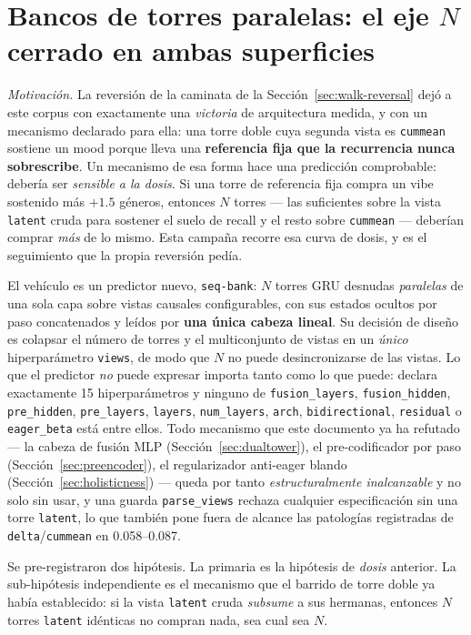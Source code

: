 \documentclass[11pt]{article}
\begin{document}
\section{Bancos de torres paralelas: el eje $N$ cerrado en ambas superficies}
\label{sec:towerbank}
\emph{Motivación.} La reversión de la caminata de la
Sección~\ref{sec:walk-reversal} dejó a este corpus con exactamente una
\emph{victoria} de arquitectura medida, y con un mecanismo declarado para ella:
una torre doble cuya segunda vista es \texttt{cummean} sostiene un mood porque
lleva una \textbf{referencia fija que la recurrencia nunca sobrescribe}. Un
mecanismo de esa forma hace una predicción comprobable: debería ser
\emph{sensible a la dosis}. Si una torre de referencia fija compra un vibe
sostenido más $+\num{1.5}$ géneros, entonces $N$ torres --- las suficientes sobre
la vista \texttt{latent} cruda para sostener el suelo de recall y el resto sobre
\texttt{cummean} --- deberían comprar \emph{más} de lo mismo. Esta campaña
recorre esa curva de dosis, y es el seguimiento que la propia reversión pedía.

El vehículo es un predictor nuevo, \texttt{seq-bank}: $N$ torres GRU desnudas
\emph{paralelas} de una sola capa sobre vistas causales configurables, con sus
estados ocultos por paso concatenados y leídos por \textbf{una única cabeza
lineal}. Su decisión de diseño es colapsar el número de torres y el multiconjunto
de vistas en un \emph{único} hiperparámetro \texttt{views}, de modo que $N$ no
puede desincronizarse de las vistas. Lo que el predictor \emph{no} puede expresar
importa tanto como lo que puede: declara exactamente \num{15} hiperparámetros y
ninguno de \texttt{fusion\_layers}, \texttt{fusion\_hidden},
\texttt{pre\_hidden}, \texttt{pre\_layers}, \texttt{layers},
\texttt{num\_layers}, \texttt{arch}, \texttt{bidirectional}, \texttt{residual} o
\texttt{eager\_beta} está entre ellos. Todo mecanismo que este documento ya ha
refutado --- la cabeza de fusión MLP (Sección~\ref{sec:dualtower}), el
pre-codificador por paso (Sección~\ref{sec:preencoder}), el regularizador
anti-eager blando (Sección~\ref{sec:holisticness}) --- queda por tanto
\emph{estructuralmente inalcanzable} y no solo sin usar, y una guarda
\texttt{parse\_views} rechaza cualquier especificación sin una torre
\texttt{latent}, lo que también pone fuera de alcance las patologías registradas
de \texttt{delta}/\texttt{cummean} en \numrange{0.058}{0.087}.

Se pre-registraron dos hipótesis. La primaria es la hipótesis de \emph{dosis}
anterior. La sub-hipótesis independiente es el mecanismo que el barrido de torre
doble ya había establecido: si la vista \texttt{latent} cruda \emph{subsume} a sus
hermanas, entonces $N$ torres \texttt{latent} idénticas no compran nada, sea cual
sea $N$.
\end{document}
